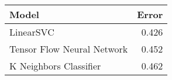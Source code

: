 \begin{tabular}{lr}
\toprule
                     Model &  Error \\
\midrule
                 LinearSVC &  0.426 \\
Tensor Flow Neural Network &  0.452 \\
    K Neighbors Classifier &  0.462 \\
\bottomrule
\end{tabular}
